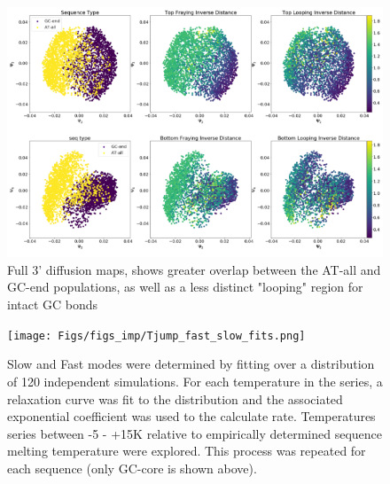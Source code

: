 \documentclass[journal=jpcbfk,manuscript=article]{achemso}
\begin{document}
\begin{figure}[ht!]
	\begin{center}
        \includegraphics[width=\textwidth]{Figs/figs_imp/GC-end_dmaps_3prime.PNG}
        \caption{Full 3' diffusion maps, shows greater overlap between the AT-all and GC-end populations, as well as a less distinct "looping" region for intact GC bonds}
        \label{fig:GC-end_dmaps_3prime}
	\end{center}
\end{figure}

\begin{figure}[ht!]
	\begin{center}
        \texttt{[image: Figs/figs\_imp/Tjump\_fast\_slow\_fits.png]}
        \caption{Slow and Fast modes were determined by fitting over a distribution of 120 independent simulations. For each temperature in the series, a relaxation curve was fit to the distribution and the associated exponential coefficient was used to the calculate rate. Temperatures series between -5 - +15K relative to empirically determined sequence melting temperature were explored. This process was repeated for each sequence (only GC-core is shown above).}
        \label{fig:fast_slow_fits}
	\end{center}
\end{figure}
\end{document}
